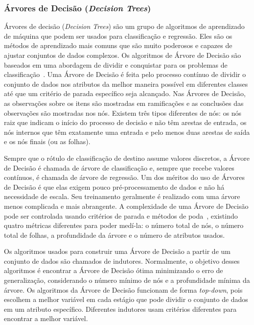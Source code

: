 \documentclass[portugues]{ic-tese}
\begin{document}
\subsubsection{Árvores de Decisão (\textit{Decision Trees})}

Árvores de decisão (\textit{Decision Trees}) são um grupo de algoritmos de aprendizado de máquina que podem ser usados para classificação e regressão. Eles são os métodos de aprendizado mais comuns que são muito poderosos e capazes de ajustar conjuntos de dados complexos. Os algoritmos de Árvore de Decisão são baseados em uma abordagem de dividir e conquistar para os problemas de classificação~\citep{Witten_2016}. Uma Árvore de Decisão é feita pelo processo contínuo de dividir o conjunto de dados nos atributos da melhor maneira possível em diferentes classes até que um critério de parada específico seja alcançado. Nas Árvores de Decisão, as observações sobre os itens são mostradas em ramificações e as conclusões das observações são mostradas nos nós. Existem três tipos diferentes de nós: os nós raiz que indicam o início do processo de decisão e não têm arestas de entrada, os nós internos que têm exatamente uma entrada e pelo menos duas arestas de saída e os nós finais (ou as folhas).

Sempre que o rótulo de classificação de destino assume valores discretos, a Árvore de Decisão é chamada de árvore de classificação e, sempre que recebe valores contínuos, é chamada de árvore de regressão. Um dos méritos do uso de Árvores de Decisão é que elas exigem pouco pré-processamento de dados e não há necessidade de escala. Seu treinamento geralmente é realizado com uma árvore menos complicada e mais abrangente. A complexidade de uma Árvore de Decisão pode ser controlada usando critérios de parada e métodos de poda~\citep{Rokach_2005}, existindo quatro métricas diferentes para poder medí-la: o número total de nós, o número total de folhas, a profundidade da árvore e o número de atributos usados.

Os algoritmos usados para construir uma Árvore de Decisão a partir de um conjunto de dados são chamados de indutores. Normalmente, o objetivo desses algoritmos é encontrar a Árvore de Decisão ótima minimizando o erro de generalização, considerando o número mínimo de nós e a profundidade mínima da árvore. Os algoritmos da Árvore de Decisão funcionam de forma \textit{top-down}, pois escolhem a melhor variável em cada estágio que pode dividir o conjunto de dados em um atributo específico. Diferentes indutores usam critérios diferentes para encontrar a melhor variável.
\end{document}

